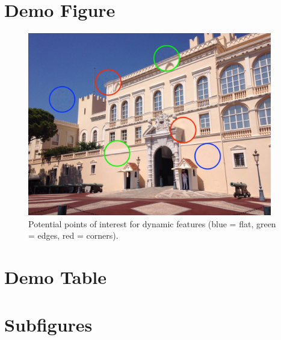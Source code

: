 \documentclass[letterpaper,12pt]{article}
\begin{document}
\begin{appendices}

\clearpage





\clearpage
\section{Demo Figure}
\label{sec:appendix-demo-figure}

\begin{figure}[h]
\centerline{\includegraphics[width=0.95\textwidth]{figures/demo_figure.jpg}}
\caption{\label{fig:demo_figure}Potential points of interest for dynamic features (blue = flat, green = edges, red = corners).}
\end{figure}


\clearpage
\section{Demo Table}
\label{sec:appendix-demo-table}




\clearpage
\section{Subfigures}
\label{sec:appendix-subfigures}


\end{appendices}
\end{document}
